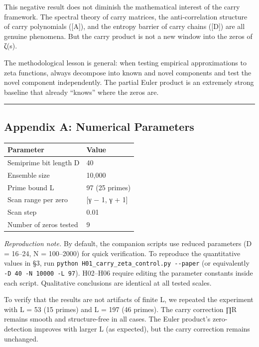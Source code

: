 \documentclass[
  11pt,
]{article}
\begin{document}
This negative result does not diminish the mathematical interest of the carry
framework. The spectral theory of carry matrices, the anti-correlation structure
of carry polynomials ({[}A{]}), and the entropy barrier of carry chains
({[}D{]}) are all genuine phenomena. But the carry product is not a new window
into the zeros of ζ(s).

The methodological lesson is general: when testing empirical approximations to
zeta functions, always decompose into known and novel components and test the
novel component independently. The partial Euler product is an extremely strong
baseline that already ``knows'' where the zeros are.

\begin{center}\rule{0.5\linewidth}{0.5pt}\end{center}

\newpage

\subsection{Appendix A: Numerical
Parameters}\label{appendix-a-numerical-parameters}

\begin{longtable}[]{@{}ll@{}}
\toprule\noalign{}
Parameter & Value \\
\midrule\noalign{}
\endhead
\bottomrule\noalign{}
\endlastfoot
Semiprime bit length D & 40 \\
Ensemble size & 10,000 \\
Prime bound L & 97 (25 primes) \\
Scan range per zero & {[}γ − 1, γ + 1{]} \\
Scan step & 0.01 \\
Number of zeros tested & 9 \\
\end{longtable}

\emph{Reproduction note.} By default, the companion scripts use reduced
parameters (D = 16--24, N = 100--2000) for quick verification. To reproduce the
quantitative values in §3, run
\texttt{python\ H01\_carry\_zeta\_control.py\ -\/-paper} (or equivalently
\texttt{-D\ 40\ -N\ 10000\ -L\ 97}). H02--H06 require editing the parameter
constants inside each script. Qualitative conclusions are identical at all
tested scales.

To verify that the results are not artifacts of finite L, we repeated the
experiment with L = 53 (15 primes) and L = 197 (46 primes). The carry correction
∏R remains smooth and structure-free in all cases. The Euler product's
zero-detection improves with larger L (as expected), but the carry correction
remains unchanged.
\end{document}
